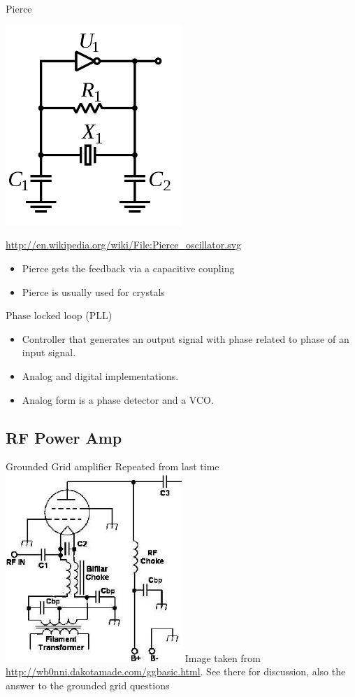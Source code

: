 \documentclass{beamer}
\begin{document}
\begin{frame}{Pierce}{}
\begin{centering}
\includegraphics[width=0.5\textwidth]{images/pierce.png}

\tiny{\url{http://en.wikipedia.org/wiki/File:Pierce_oscillator.svg}}
\end{centering}
\begin{itemize}
\item Pierce gets the feedback via a capacitive coupling
\item Pierce is usually used for crystals
\end{itemize}
\end{frame}

\begin{frame}{Phase locked loop (PLL)}{}
\begin{itemize}
\item Controller that generates an output signal with phase related to phase of an input signal.
\item Analog and digital implementations.
\item Analog form is a phase detector and a VCO.
\end{itemize}
\end{frame}

\subsection{RF Power Amp}
\begin{frame}{Grounded Grid amplifier}{}
\small{Repeated from last time}
\includegraphics[width=0.5\textwidth]{images/gg1.jpg}
Image taken from \url{http://wb0nni.dakotamade.com/ggbasic.html}.  See there for discussion, also the answer to the grounded grid questions
\end{frame}
\end{document}
